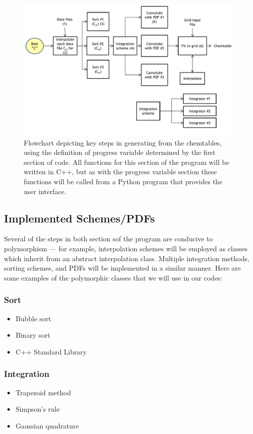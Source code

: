 \documentclass[11pt]{article}
\begin{document}
\begin{figure}[h]
  \centering
  \includegraphics[width=\textwidth]{diagram_2_v4.pdf}
  \caption{\label{fig:flow2}Flowchart depicting key steps in
    generating from the chemtables, using the definition of progress
    variable determined by the first section of code. All functions
    for this section of the program will be written in C++, but as
    with the progress variable section these functions will be called
    from a Python program that provides the user interface.}
\end{figure}

\subsection{Implemented Schemes/PDFs}
Several of the steps in both section sof the program are conducive to
polymorphism --- for example, interpolation schemes will be employed
as classes which inherit from an abstract interpolation
class. Multiple integration methods, sorting schemes, and PDFs will be
implemented in a similar manner. Here are some examples of the
polymorphic classes that we will use in our codes:

\subsubsection{Sort}
\begin{itemize}
\item Bubble sort 
\item Binary sort
\item C++ Standard Library
\end{itemize}

\subsubsection{Integration}
\begin{itemize}
\item Trapezoid method
\item Simpson's rule
\item Gaussian quadrature
\end{itemize}
\end{document}
